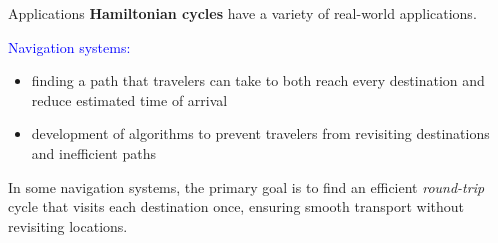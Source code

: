 \documentclass[pdf]{beamer}
\begin{document}
    \begin{frame}{Applications}
        \textbf{Hamiltonian cycles} have a variety of real-world applications.

        \vspace{10px}

        \textcolor{blue}{Navigation systems:}
        \begin{itemize}
            \item finding a path that travelers can take to both reach every destination and reduce estimated time of arrival
            \item development of algorithms to prevent travelers from revisiting destinations and inefficient paths
        \end{itemize}
        
        \vspace{20px}

        In some navigation systems, the primary goal is to find an efficient \emph{round-trip} cycle that visits each destination once, ensuring smooth transport without revisiting locations.



    \end{frame}
\end{document}

